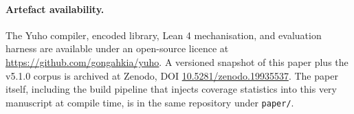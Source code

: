 \paragraph{Artefact availability.} The Yuho compiler, encoded library,
Lean 4 mechanisation, and evaluation harness are available under an
open-source licence at \url{https://github.com/gongahkia/yuho}. A
versioned snapshot of this paper plus the v5.1.0 corpus is archived
at Zenodo, DOI
\href{https://doi.org/10.5281/zenodo.19935537}{10.5281/zenodo.19935537}.
The paper itself, including the build pipeline that injects coverage
statistics into this very manuscript at compile time, is in the same
repository under \texttt{paper/}.
